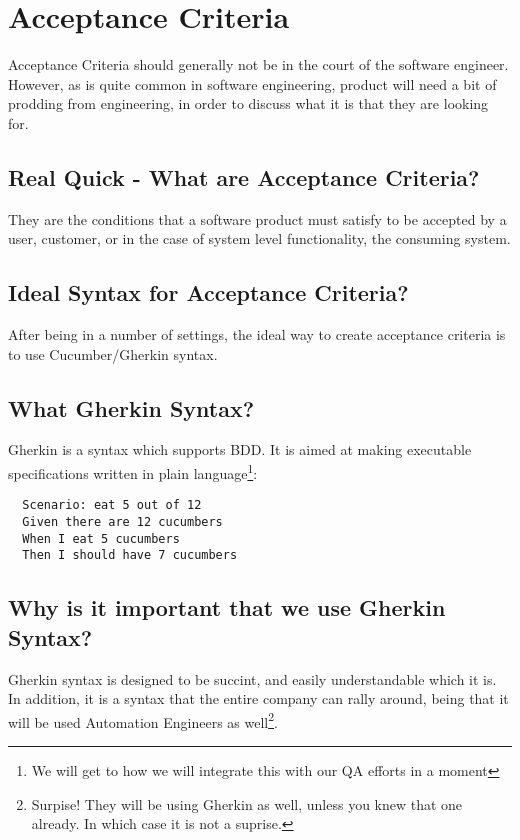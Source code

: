 \maketitle{}
\section{ Acceptance Criteria }
Acceptance Criteria should generally not be in the court of the software
engineer. However, as is quite common in software engineering, product will
need a bit of prodding from engineering, in order to discuss what it is that
they are looking for.

\subsection{ Real Quick - What are Acceptance Criteria? }
They are the conditions that a software product must satisfy to be accepted by
a user, customer, or in the case of system level functionality, the consuming
system.

\subsection{ Ideal Syntax for Acceptance Criteria? }
After being in a number of settings, the ideal way to create acceptance criteria
is to use Cucumber/Gherkin syntax.

\subsection{ What Gherkin Syntax? }
Gherkin is a syntax which supports BDD. It is aimed at making executable
specifications written in plain language\footnote{We will get to how we will
integrate this with our QA efforts in a moment}:
\begin{verbatim}
  Scenario: eat 5 out of 12
  Given there are 12 cucumbers
  When I eat 5 cucumbers
  Then I should have 7 cucumbers
\end{verbatim}

\subsection{ Why is it important that we use Gherkin Syntax? }
Gherkin syntax is designed to be succint, and easily understandable which it is.
In addition, it is a syntax that the entire company can rally around, being that
it will be used Automation Engineers as well\footnote{Surpise! They will be
using Gherkin as well, unless you knew that one already. In which case it is
not a suprise.}.
